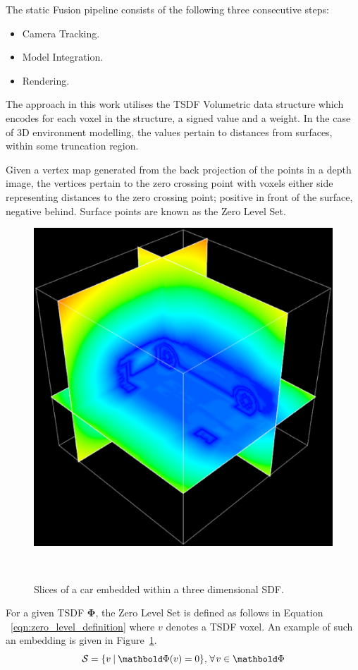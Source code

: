 The static Fusion pipeline consists of the following three consecutive steps:
\begin{itemize}
  \item Camera Tracking.
  \item Model Integration.
  \item Rendering.
\end{itemize}

The approach in this work utilises the TSDF Volumetric data structure which
encodes for each voxel in the structure, a signed value and a weight.
In the case of 3D environment modelling, the values pertain to distances from
surfaces, within some truncation region.

Given a vertex map generated from the back projection of the points in a depth
image, the vertices pertain to the zero crossing point with voxels either side
representing distances to the zero crossing point; positive in front of the
surface, negative behind. Surface points are known as the Zero Level Set.
\begin{figure}[!htbp]
  \centering
  \includegraphics[width=.7\linewidth]{figures/moseg/sdf_cross_section.eps}
  \caption[Signed Distance Function]{Slices of a car embedded within a 
  three dimensional SDF.}
~\label{figure:sdf_example}
\end{figure}

For a given TSDF \(\bm{\Phi}\), the Zero Level Set is defined as follows in Equation
~\ref{eqn:zero_level_definition} where \(v\) denotes a TSDF voxel. An example of such an 
embedding is given in Figure~\ref{figure:sdf_example}.
\begin{equation}
  \label{eqn:zero_level_definition}
  \mathcal{S} = \{v \given \bm{\Phi}(v) = 0\}, 
  \mkern2mu \forall \mkern2mu v \in \bm{\Phi}
\end{equation}

